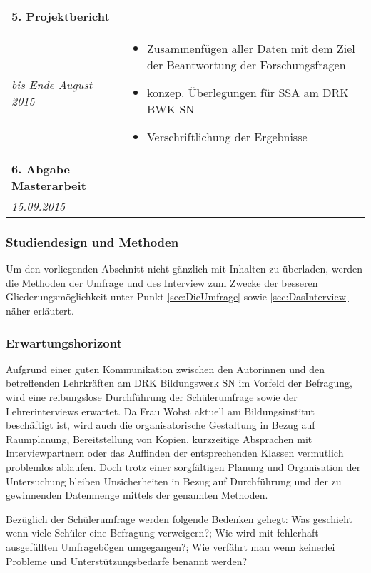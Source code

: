\begin{longtable}{l|p{9.8cm}}
	\textbf{5. Projektbericht} & \\*
	\emph{bis Ende August 2015} &
	\vspace*{-0.6cm}
	\begin{itemize}[nosep,topsep=-0.6cm]
		\item Zusammenfügen aller Daten mit dem Ziel der Beantwortung der Forschungsfragen
		\item konzep. Überlegungen für SSA am DRK BWK SN
		\item Verschriftlichung der Ergebnisse
	\end{itemize} \\
	
	\textbf{6. Abgabe Masterarbeit} & \\*
	\emph{15.09.2015} & \\
	
\end{longtable}

\newpage

\subsubsection{Studiendesign und Methoden}
\label{sec:StudiendesignUndMethoden}

Um den vorliegenden Abschnitt nicht gänzlich mit Inhalten zu überladen, werden die Methoden der Umfrage und des Interview zum Zwecke der besseren Gliederungsmöglichkeit unter Punkt \ref{sec:DieUmfrage} sowie \ref{sec:DasInterview} näher erläutert.

\subsubsection{Erwartungshorizont}
\label{sec:Erwartungshorizont}

Aufgrund einer guten Kommunikation zwischen den Autorinnen und den betreffenden Lehrkräften am DRK Bildungswerk SN im Vorfeld der Befragung, wird eine reibungslose Durchführung der Schülerumfrage sowie der Lehrerinterviews erwartet. Da Frau Wobst aktuell am Bildungsinstitut beschäftigt ist, wird auch die organisatorische Gestaltung in Bezug auf Raumplanung, Bereitstellung von Kopien, kurzzeitige Absprachen mit Interviewpartnern oder das Auffinden der entsprechenden Klassen vermutlich problemlos ablaufen. Doch trotz einer sorgfältigen Planung und Organisation der Untersuchung bleiben Unsicherheiten in Bezug auf Durchführung und der zu gewinnenden Datenmenge mittels der genannten Methoden.

Bezüglich der Schülerumfrage werden folgende Bedenken gehegt: Was geschieht wenn viele Schüler eine Befragung verweigern?; Wie wird mit fehlerhaft ausgefüllten Umfragebögen umgegangen?; Wie verfährt man wenn keinerlei Probleme und Unterstützungsbedarfe benannt werden?

